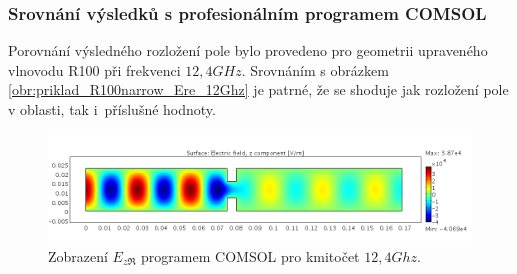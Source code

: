 \subsubsection*{Srovnání výsledků s profesionálním programem COMSOL}
Porovnání výsledného rozložení pole bylo provedeno pro geometrii upraveného vlnovodu R100 při frekvenci $12,4\unit{GHz}$. Srovnáním s obrázkem \ref{obr:priklad_R100narrow_Ere_12Ghz} je patrné, že se shoduje jak rozložení pole v oblasti, tak i~příslušné hodnoty.
\begin{figure}[!h]
	\centering
	\includegraphics[width=15cm]{priklad_R100_comsol.png}
	\caption{Zobrazení $E_{z\Re}$ programem COMSOL pro kmitočet $12,4\unit{Ghz}$.}
	\label{obr:priklad_R100_comsol}
\end{figure}
